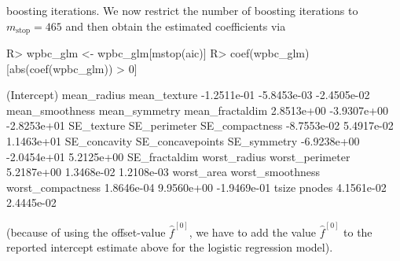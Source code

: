 \documentclass{article}
\newcommand{\Robject}[1]{\texttt{#1}}
\newenvironment{Schunk}{}{}
\begin{document}
boosting iterations. 
We now restrict the number of boosting iterations to 
$m_\text{stop} = 465$ and then obtain the estimated
coefficients via 
\begin{Schunk}
\begin{Sinput}
R> wpbc_glm <- wpbc_glm[mstop(aic)]
R> coef(wpbc_glm)[abs(coef(wpbc_glm)) > 0]
\end{Sinput}
\begin{Soutput}
      (Intercept)       mean_radius      mean_texture 
      -1.2511e-01       -5.8453e-03       -2.4505e-02 
  mean_smoothness     mean_symmetry   mean_fractaldim 
       2.8513e+00       -3.9307e+00       -2.8253e+01 
       SE_texture      SE_perimeter    SE_compactness 
      -8.7553e-02        5.4917e-02        1.1463e+01 
     SE_concavity  SE_concavepoints       SE_symmetry 
      -6.9238e+00       -2.0454e+01        5.2125e+00 
    SE_fractaldim      worst_radius   worst_perimeter 
       5.2187e+00        1.3468e-02        1.2108e-03 
       worst_area  worst_smoothness worst_compactness 
       1.8646e-04        9.9560e+00       -1.9469e-01 
            tsize            pnodes 
       4.1561e-02        2.4445e-02 
\end{Soutput}
\end{Schunk}
(because of using the offset-value $\hat{f}^{[0]}$, we have to add the value
$\hat{f}^{[0]}$ to the reported intercept estimate above for the logistic
regression model). 
\end{document}
